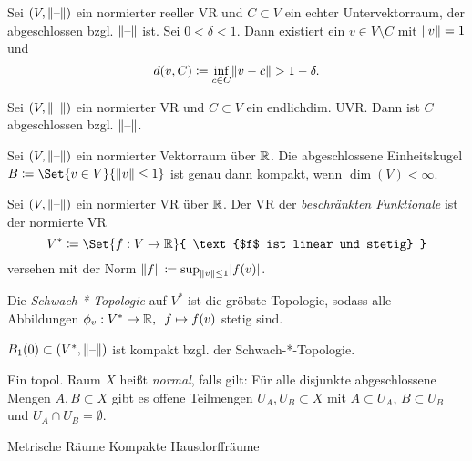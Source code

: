 \documentclass{cheat-sheet}
\newcommand{\inlineitem}[1]{\textbullet \enspace #1} %
\begin{document}
\begin{lem}[Riesz]
  Sei $(V, \lVert\text{--}\rVert)$ ein normierter reeller VR und $C \subset V$ ein echter Untervektorraum, der abgeschlossen bzgl. $\lVert\text{--}\rVert$ ist. Sei $0 < \delta < 1$. Dann existiert ein $v \in V \setminus C$ mit $\lVert v\rVert = 1$ und
  \[ d(v, C) \coloneqq \inf_{c \in C} \lVert v - c\rVert > 1 - \delta. \]
\end{lem}

\begin{lem}
  Sei $(V, \lVert\text{--}\rVert)$ ein normierter VR und $C \subset V$ ein endlichdim. UVR. Dann ist $C$ abgeschlossen bzgl. $\lVert\text{--}\rVert$.
\end{lem}

\begin{prop}
  Sei $(V, \lVert\text{--}\rVert)$ ein normierter Vektorraum über $\mathbb{R}$. Die abgeschlossene Einheitskugel $B \coloneqq \Set{ v \in V }{ \norm{v} \leq 1 }$ ist genau dann kompakt, wenn $\dim(V) < \infty$.
\end{prop}

\begin{defn}
  Sei $(V, \lVert\text{--}\rVert)$ ein normierter VR über $\mathbb{R}$. Der VR der \emph{beschränkten Funktionale} ist der normierte VR
  \[ V^* \coloneqq \Set{ f : V \to \R }{ \text{$f$ ist linear und stetig} } \]
  versehen mit der Norm $\lVert f\rVert \coloneqq \sup_{\lVert v\rVert \leq 1} \lvert f(v)\rvert$.
\end{defn}

\begin{defn}
  Die \emph{Schwach-*-Topologie} auf $V^*$ ist die gröbste Topologie, sodass alle Abbildungen $\phi_v : V^* \to \mathbb{R}, \enspace f \mapsto f(v)$ stetig sind.
\end{defn}

\begin{satz}
  $B_1(0) \subset (V^*, \lVert\text{--}\rVert)$ ist kompakt bzgl. der Schwach-*-Topologie.
\end{satz}


\begin{defn}
  Ein topol. Raum $X$ heißt \emph{normal}, falls gilt: Für alle disjunkte abgeschlossene Mengen $A, B \subset X$ gibt es offene Teilmengen $U_A, U_B \subset X$ mit $A \subset U_A$, $B \subset U_B$ und $U_A \cap U_B = \emptyset$.
\end{defn}

\begin{bspe}
  \inlineitem{Metrische Räume} \quad
  \inlineitem{Kompakte Hausdorffräume}
\end{bspe}
\end{document}
